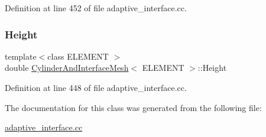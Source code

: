 Definition at line 452 of file adaptive\+\_\+interface.\+cc.

\mbox{\label{classCylinderAndInterfaceMesh_a5ad81e65a9e9fb4c709a0c84f38216b1}} 
\subsubsection{\texorpdfstring{Height}{Height}}
{\footnotesize\ttfamily template$<$class E\+L\+E\+M\+E\+NT $>$ \\
double \hyperlink{classCylinderAndInterfaceMesh}{Cylinder\+And\+Interface\+Mesh}$<$ E\+L\+E\+M\+E\+NT $>$\+::Height\hspace{0.3cm}{\ttfamily [private]}}



Definition at line 448 of file adaptive\+\_\+interface.\+cc.



The documentation for this class was generated from the following file\+:\begin{DoxyCompactItemize}
\item 
\hyperlink{adaptive__interface_8cc}{adaptive\+\_\+interface.\+cc}\end{DoxyCompactItemize}
